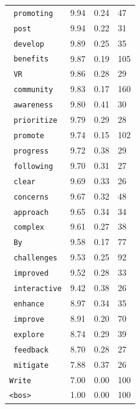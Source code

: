 \begin{table}[h!]
\begin{tabular}{llll}
\texttt{ promoting} & 9.94 & 0.24 & 47 \\
\texttt{ post} & 9.94 & 0.22 & 31 \\
\texttt{ develop} & 9.89 & 0.25 & 35 \\
\texttt{ benefits} & 9.87 & 0.19 & 105 \\
\texttt{ VR} & 9.86 & 0.28 & 29 \\
\texttt{ community} & 9.83 & 0.17 & 160 \\
\texttt{ awareness} & 9.80 & 0.41 & 30 \\
\texttt{ prioritize} & 9.79 & 0.29 & 28 \\
\texttt{ promote} & 9.74 & 0.15 & 102 \\
\texttt{ progress} & 9.72 & 0.38 & 29 \\
\texttt{ following} & 9.70 & 0.31 & 27 \\
\texttt{ clear} & 9.69 & 0.33 & 26 \\
\texttt{ concerns} & 9.67 & 0.32 & 48 \\
\texttt{ approach} & 9.65 & 0.34 & 34 \\
\texttt{ complex} & 9.61 & 0.27 & 38 \\
\texttt{ By} & 9.58 & 0.17 & 77 \\
\texttt{ challenges} & 9.53 & 0.25 & 92 \\
\texttt{ improved} & 9.52 & 0.28 & 33 \\
\texttt{ interactive} & 9.42 & 0.38 & 26 \\
\texttt{ enhance} & 8.97 & 0.34 & 35 \\
\texttt{ improve} & 8.91 & 0.20 & 70 \\
\texttt{ explore} & 8.74 & 0.29 & 39 \\
\texttt{ feedback} & 8.70 & 0.28 & 27 \\
\texttt{ mitigate} & 7.88 & 0.37 & 26 \\
\texttt{Write} & 7.00 & 0.00 & 100 \\
\texttt{<bos>} & 1.00 & 0.00 & 100 \\
\bottomrule
\end{tabular}
\end{table}
